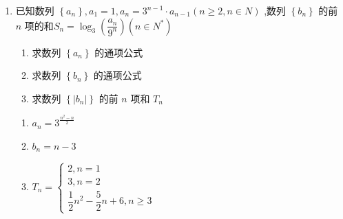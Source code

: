 \begin{enumerate}
\begin{jieda}
\begin{enumerate}
            又 $ {a}_{n} > 0 $ ,所以 $ {a}_{n + 1} - 2{a}_{n} = 0 $ ,即 $ \dfrac{{a}_{n + 1}}{{a}_{n}} = 2 $ ,所以数列 $ \left\{  {a}_{n}\right\} $ 是以 2 为首项,以 2 为公比的等比数列.
            \item 由(1)得 $ {a}_{n} = {2}^{n} $ ,则 $ {b}_{n} = \left( {n + 2}\right)  \cdot  {2}^{n} $ 
            
            $ {S}_{n} = 3 \times  2 + 4 \times  {2}^{2} + 5 \times  {2}^{3} + \cdots  + \left( {n + 2}\right)  \cdot  {2}^{n}, $
            $ 2{S}_{n} = 3 \times  {2}^{2} + 4 \times  {2}^{3} + 5 \times  {2}^{4} + \cdots  + \left( {n + 2}\right)  \cdot  {2}^{n + 1}, $
            两式相减得 $ - {S}_{n} = 3 \times  2 + {2}^{2} + {2}^{3} + \cdots  + {2}^{n} - \left( {n + 2}\right)  \cdot  {2}^{n + 1} $
            $ = 4 + {2}^{1} + {2}^{2} + {2}^{3} + \cdots  + {2}^{n} - \left( {n + 2}\right)  \cdot  {2}^{n + 1} = 4 + \dfrac{2\left( {1 - {2}^{n}}\right) }{1 - 2} - \left( {n + 2}\right)  \cdot  {2}^{n + 1} = 2 - \left( {n + 1}\right)  \cdot  {2}^{n + 1} $
            即 $ {S}_{n} = \left( {n + 1}\right)  \cdot  {2}^{n + 1} - 2 $ .
        \end{enumerate}
    \end{jieda}
    
    \item 已知数列 $\left\{  {a}_{n}\right\}  ,{a}_{1} = 1,{a}_{n} = {3}^{n - 1} \cdot  {a}_{n - 1}\left( {n \geq  2,n \in  N}\right)$ ,数列 $\left\{  {b}_{n}\right\}$ 的前 $n$ 项的和${S}_{n} = {\log }_{3}\left( \dfrac{{a}_{n}}{{9}^{n}}\right) \left( {n \in  {N}^{ * }}\right) $
    \begin{enumerate}
        \item 求数列 $\left\{  {a}_{n}\right\}$ 的通项公式
        \item 求数列 $\left\{  {b}_{n}\right\}$ 的通项公式
        \item 求数列 $\left\{  \left| {b}_{n}\right| \right\}$ 的前 $n$ 项和 ${T}_{n}$
    \end{enumerate}
    \begin{jieda}
        \begin{enumerate}
            \item ${a}_{n} = {3}^{\frac{{n}^{2} - n}{2}}$
            \item ${b}_{n} = n - 3$
            \item ${T}_{n} = \left\{  \begin{array}{l} 2,n = 1 \\  3,n = 2 \\  \dfrac{1}{2}{n}^{2} - \dfrac{5}{2}n + 6,n \geq  3 \end{array}\right.$


\end{enumerate}
\end{jieda}
\end{enumerate}

